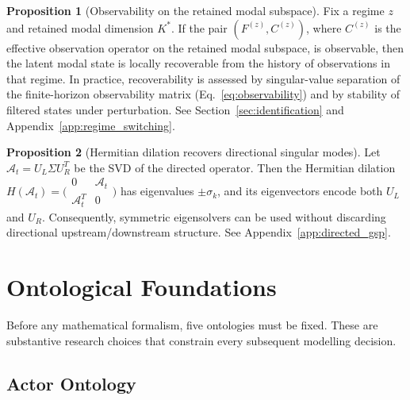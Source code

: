 \documentclass[11pt,a4paper]{article}
\theoremstyle{definition}
\newtheorem{proposition}{Proposition}[section]
\begin{document}
\begin{proposition}[Observability on the retained modal subspace]
\label{prop:observability}
Fix a regime $z$ and retained modal dimension $K^*$. If the pair $(F^{(z)}, C^{(z)})$, where $C^{(z)}$ is the effective observation operator on the retained modal subspace, is observable, then the latent modal state is locally recoverable from the history of observations in that regime. In practice, recoverability is assessed by singular-value separation of the finite-horizon observability matrix (Eq.~\ref{eq:observability}) and by stability of filtered states under perturbation. See Section~\ref{sec:identification} and Appendix~\ref{app:regime_switching}.
\end{proposition}

\begin{proposition}[Hermitian dilation recovers directional singular modes]
\label{prop:hermitian}
Let $\mathcal{A}_t = U_L \Sigma U_R^T$ be the SVD of the directed operator. Then the Hermitian dilation $H(\mathcal{A}_t) = \bigl(\begin{smallmatrix} 0 & \mathcal{A}_t \\ \mathcal{A}_t^T & 0 \end{smallmatrix}\bigr)$ has eigenvalues $\pm\sigma_k$, and its eigenvectors encode both $U_L$ and $U_R$. Consequently, symmetric eigensolvers can be used without discarding directional upstream/downstream structure. See Appendix~\ref{app:directed_gsp}.
\end{proposition}


\section{Ontological Foundations}
\label{sec:ontology}

Before any mathematical formalism, five ontologies must be fixed. These are substantive research choices that constrain every subsequent modelling decision.

\subsection{Actor Ontology}
\end{document}
